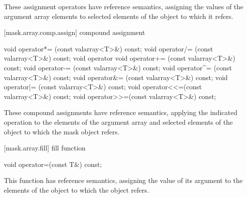 \begin{itemdescr}
\pnum
These assignment operators have reference semantics, assigning the values
of the argument array elements to selected elements of the
object to which it refers.
\end{itemdescr}

[mask.array.comp.assign]{ compound assignment}

%
%
%
%
%
%
%
%
%
%
%
%
\begin{itemdecl}
void operator*= (const valarray<T>&) const;
void operator/= (const valarray<T>&) const;
void operator%
void operator+= (const valarray<T>&) const;
void operator-= (const valarray<T>&) const;
void operator^= (const valarray<T>&) const;
void operator&= (const valarray<T>&) const;
void operator|= (const valarray<T>&) const;
void operator<<=(const valarray<T>&) const;
void operator>>=(const valarray<T>&) const;
\end{itemdecl}

\begin{itemdescr}
\pnum
These compound assignments have reference semantics, applying the
indicated operation to the elements of the argument array and selected elements
of the
object to which the mask object refers.
\end{itemdescr}

[mask.array.fill]{ fill function}

%
\begin{itemdecl}
void operator=(const T&) const;
\end{itemdecl}

\begin{itemdescr}
\pnum
This function has reference semantics, assigning the value of its
argument to the elements of the
object to which the
object refers.
\end{itemdescr}

